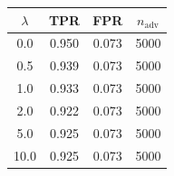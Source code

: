 \begin{tabular}{cccc}
\toprule
$\lambda$ & TPR & FPR & $n_{\text{adv}}$ \\
\midrule
0.0  & 0.950 & 0.073 & 5000 \\
0.5  & 0.939 & 0.073 & 5000 \\
1.0  & 0.933 & 0.073 & 5000 \\
2.0  & 0.922 & 0.073 & 5000 \\
5.0  & 0.925 & 0.073 & 5000 \\
10.0 & 0.925 & 0.073 & 5000 \\
\bottomrule
\end{tabular}
